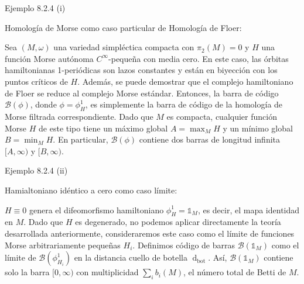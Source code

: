 \documentclass{beamer}
\def\dbot{\operatorname{d}_{\operatorname{bot}}}
\begin{document}
\begin{frame}{Ejemplo 8.2.4 (i)}

Homología de Morse como caso particular de Homología de Floer: \pause

Sea $(M, \omega)$ una variedad simpléctica compacta con $\pi_2(M) =0$ y $H$ una función Morse autónoma $C^{\infty}$-pequeña con media cero. \pause En este caso, las órbitas hamiltonianas 1-periódicas son lazos constantes y están en biyección con los puntos críticos de $H$. \pause Además, se puede demostrar que el complejo hamiltoniano de Floer se reduce al complejo Morse estándar. \pause Entonces, la barra de código $\mathcal B(\phi)$, donde $\phi = \phi_H^1$, es simplemente la barra de código de la homología de Morse filtrada correspondiente. \pause Dado que $M$ es compacta, cualquier función Morse $H$ de este tipo tiene un máximo global $A = \max_{M} H$ y un mínimo global $B = \min_{M} H$. \pause En particular, $\mathcal B(\phi)$ contiene dos barras de longitud infinita $[A, \infty)$ y $[B, \infty)$.

    
\end{frame}

\begin{frame}{Ejemplo 8.2.4 (ii)}

Hamialtoniano idéntico a cero como caso límite: \pause

$H \equiv 0$ genera el difeomorfismo hamiltoniano $\phi_H^1 = \mathds{1}_M$, es decir, el mapa identidad en $M$. \pause Dado que $H$ es degenerado, no podemos aplicar directamente la teoría desarrollada anteriormente, consideraremos este caso como el límite de funciones Morse arbitrariamente pequeñas $H_i$. \pause Definimos código de barras $\mathcal B(\mathds{1}_M)$ como el límite de $\mathcal B(\phi_{H_i}^1)$ en la distancia cuello de botella $\dbot$. \pause Así, $\mathcal B(\mathds{1}_M)$ contiene solo la barra $[0, \infty)$ con multiplicidad $\sum_{i} b_i(M)$, el número total de Betti de $M$.

    
\end{frame}
\end{document}
